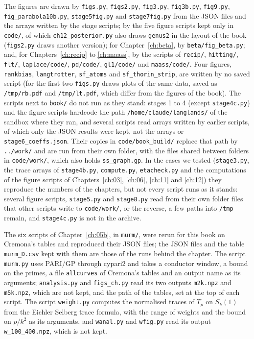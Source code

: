 The figures are drawn by \texttt{figs.py}, \texttt{figs2.py}, \texttt{fig3.py}, \texttt{fig3b.py}, \texttt{fig9.py}, \texttt{fig\_parabola10b.py}, \texttt{stage5fig.py} and \texttt{stage7fig.py} from the JSON files and the arrays written by the stage scripts; by the five figure scripts kept only in \texttt{code/}, of which \texttt{ch12\_posterior.py} also draws \texttt{genus2} in the layout of the book (\texttt{figs2.py} draws another version); for Chapter~\ref{ch:beta}, by \texttt{beta/fig\_beta.py}; and, for Chapters~\ref{ch:recip} to \ref{ch:maass}, by the scripts of \texttt{recip/}, \texttt{hitting/}, \texttt{flt/}, \texttt{laplace/\allowbreak code/}, \texttt{pd/\allowbreak code/}, \texttt{gl1/\allowbreak code/} and \texttt{maass/\allowbreak code/}. Four figures, \texttt{rankbias}, \texttt{langtrotter}, \texttt{sf\_atoms} and \texttt{sf\_thorin\_strip}, are written by no saved script (for the first two \texttt{figs.py} draws plots of the same data, saved as \texttt{/tmp/rb.pdf} and \texttt{/tmp/lt.pdf}, which differ from the figures of the book). The scripts next to \texttt{book/} do not run as they stand: stages 1 to 4 (except \texttt{stage4c.py}) and the figure scripts hardcode the path \texttt{/home/claude/langlands/} of the sandbox where they ran, and several scripts read arrays written by earlier scripts, of which only the JSON results were kept, not the arrays or \texttt{stage6\_coeffs.json}. Their copies in \texttt{code/book\_build/} replace that path by \texttt{../work/} and are run from their own folder, with the files shared between folders in \texttt{code/work/}, which also holds \texttt{ss\_graph.gp}. In the cases we tested (\texttt{stage3.py}, the trace arrays of \texttt{stage4b.py}, \texttt{compute.py}, \texttt{etacheck.py} and the computations of the figure scripts of Chapters~\ref{ch:03}, \ref{ch:06}, \ref{ch:11} and \ref{ch:12}) they reproduce the numbers of the chapters, but not every script runs as it stands: several figure scripts, \texttt{stage5.py} and \texttt{stage8.py} read from their own folder files that other scripts write to \texttt{code/work/}, or the reverse, a few paths into \texttt{/tmp} remain, and \texttt{stage4c.py} is not in the archive.

The six scripts of Chapter~\ref{ch:05b}, in \texttt{murm/}, were rerun for this book on Cremona's tables and reproduced their JSON files; the JSON files and the table \texttt{murm\_D.csv} kept with them are those of the runs behind the chapter. The script \texttt{murm.py} uses PARI/GP through cypari2 and takes a conductor window, a bound on the primes, a file \texttt{allcurves} of Cremona's tables and an output name as its arguments; \texttt{analysis.py} and \texttt{figs\_ch.py} read its two outputs \texttt{m2k.npz} and \texttt{m5k.npz}, which are not kept, and the path of the tables, set at the top of each script. The script \texttt{weight.py} computes the normalised traces of $T_p$ on $S_k(1)$ from the Eichler Selberg trace formula, with the range of weights and the bound on $p/k^2$ as its arguments, and \texttt{wanal.py} and \texttt{wfig.py} read its output \texttt{w\_100\_400.npz}, which is not kept.

